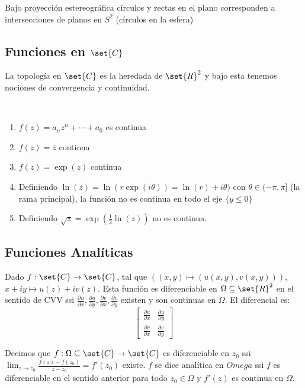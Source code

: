 \documentclass{notetaking}
\begin{document}
\begin{thm}
    Bajo proyección estereográfica círculos y rectas en el plano corresponden a intersecciones de planos en \(S^2\) (círculos en la esfera)
\end{thm}

\subsection{Funciones en \(\set{C}\)}
La topología en \(\set{C}\) es la heredada de \(\set{R}^2\) y bajo esta tenemos nociones de convergencia y continuidad.

\begin{ejm}\
    \begin{enumerate}
        \item \(f(z)=a_nz^n+\cdots+a_0\) es continua
        \item \(f(z)=\bar{z}\) continua
        \item \(f(z)=\exp(z)\) continua
        \item Definiendo \(\ln(z)=\ln(r\exp(i\theta))=\ln(r)+i\theta)\) con \(\theta\in(-\pi,\pi]\) (la rama principal), la función no es continua en todo el eje \(\{y\leq 0\}\)
        \item Definiendo \(\sqrt{z}=\exp(\frac12\ln(z))\) no es continua.
    \end{enumerate}
\end{ejm}

\subsection{Funciones Analíticas}
\begin{obs}
    Dado \(f:\set{C}\rightarrow\set{C}\), tal que \(((x,y)\mapsto(u(x,y),v(x,y)))\), \(x+iy\mapsto u(z)+iv(z)\). Esta función es diferenciable en \(\Omega\subseteq\set{R}^2\) en el sentido de CVV ssi \(\frac{\partial{u}}{\partial{x}},\frac{\partial{u}}{\partial{y}},\frac{\partial{v}}{\partial{x}},\frac{\partial{v}}{\partial{y}}\) existen y son continuas en \(\Omega\). El diferencial es:
    \[
        \begin{bmatrix}
            \frac{\partial{u}}{\partial{x}}       & \frac{\partial{u}}{\partial{y}} \\
            \frac{\partial{v}}{\partial{x}} & \frac{\partial{v}}{\partial{y}}
        \end{bmatrix}
    \]
\end{obs}

\begin{defn}
    Decimos que \(f:\Omega\subseteq\set{C}\rightarrow\set{C}\) es diferenciable en \(z_0\) ssi \(\lim_{z\rightarrow z_0}\frac{f(z)-f(z_0)}{z-z_0}=f'(z_0)\) existe. \(f\) se dice analítica en \(Omega\) ssi \(f\) es diferenciable en el sentido anterior para todo \(z_0\in\Omega\) y \(f'(z)\) es continua en \(\Omega\).
\end{defn}
\end{document}
